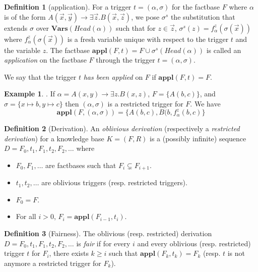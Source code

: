 \documentclass{article}
\theoremstyle{definition}
\newtheorem{definition}{Definition}[section]
\newtheorem{example}{Example}[section]
\theoremstyle{remark}
\newcommand{\Vars}{\textbf{Vars}}
\newcommand{\Appl}{\textbf{appl}}
\begin{document}
\begin{definition}[application]
For a trigger $t = (\alpha,\sigma)$ for the factbase $F$ where $\alpha$ is of the form $A(\vec x,\vec y) \rightarrow \exists \vec z. B(\vec x,\vec z)$, we pose \emph{$\sigma^s$} the substitution that extends $\sigma$ over $\Vars(\textit{Head}(\alpha))$ such that for $z \in \vec z$, $\sigma^s(z) = f^z_\alpha(\sigma(\vec x))$ where $f^z_\alpha(\sigma(\vec x))$ is a fresh variable unique with respect to the trigger $t$ and the variable $z$.
The factbase $\Appl(F,t)=F \cup \sigma^s(\textit{Head}(\alpha))$ is called an \emph{application} on the factbase $F$ through the trigger $t = (\alpha,\sigma)$. 

We say that the trigger $t$ \emph{has been applied} on $F$ if $\Appl(F,t) = F$.
\end{definition}



\begin{example}. If $\alpha = A(x,y) \rightarrow \exists z.B(x,z)$, $F = \{A(b,c)\}$, and $\sigma = \{x \mapsto b, y \mapsto c \}$ then $(\alpha,\sigma)$ is a restricted trigger for $F$. We have $$\Appl(F,(\alpha,\sigma)) = \{A(b,c),B(b,f_{\alpha}^z(b,c)\}$$
\end{example}

\begin{definition}[Derivation]
An \emph{oblivious derivation} (respectively a \emph{restricted derivation}) for a knowledge base $K= (F,R)$ is a (possibly infinite) sequence $D=F_0,t_1,F_1,t_2,F_2,\ldots$ where 
\begin{itemize}
\item $F_0,F_1,\ldots$ are factbases such that $F_i \subsetneq F_{i+1}$.
\item $t_1,t_2,\ldots$ are oblivious triggers (resp. restricted triggers).
\item $F_0 = F$.
\item For all $i > 0$, $F_{i}= \Appl(F_{i-1},t_i)$.
\end{itemize}
\end{definition}


\begin{definition}[Fairness]
The oblivious (resp. restricted) derivation $D=F_0,t_1,F_1,t_2,F_2,\ldots$ is \emph{fair} if for every $i$ and every oblivious (resp. restricted) trigger $t$ for $F_i$, there exists $k \geq i$ such that $\Appl(F_{k},t_k) = F_k$ (resp. $t$ is not anymore a restricted trigger for $F_k$).
\end{definition}
\end{document}
